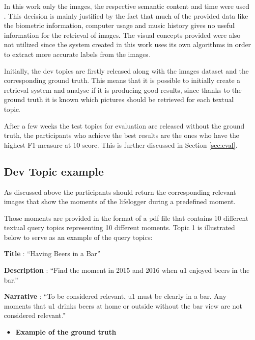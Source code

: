     
    In this work only the images, the respective semantic content and time were used \cite{Ribeiro2020}. This decision is mainly justified by the fact that much of the provided data like the biometric information, computer usage and music history gives no useful information for the retrieval of images. The visual concepts provided were also not utilized since the system created in this work uses its own algorithms in order to extract more accurate labels from the images. 
    

    Initially, the dev topics are firstly released along with the images dataset and the corresponding ground truth. This means that it is possible to initially create a retrieval system and analyse if it is producing good results, since thanks to the ground truth it is known which pictures should be retrieved for each textual topic. 

    After a few weeks the test topics for evaluation are released without the ground truth, the participants who achieve the best results are the ones who have the highest F1-measure at 10 score. This is further discussed in Section \ref{sec:eval}.
    \newpage
    \subsection{Dev Topic example}
    \label{sec:devtopic1}
    As discussed above the participants should return the corresponding relevant images that show the moments of the lifelogger during a predefined moment. 
    
    Those moments are provided in the format of a pdf file that contains 10 different textual query topics representing 10 different moments. Topic 1 is illustrated below to serve as an example of the query topics:
    


   \hfill

        \textbf{Title} : ``Having Beers in a Bar”

        \textbf{Description} : ``Find the moment in 2015 and 2016 when u1 enjoyed beers in the bar.”

        \textbf{Narrative} : ``To be considered relevant, u1 must be clearly in a bar. Any moments that u1 drinks beers at home or outside without the bar view are not considered relevant.”
        


    
    \begin{itemize}
        \item    \textbf{Example of the ground truth}
    \end{itemize}
 



